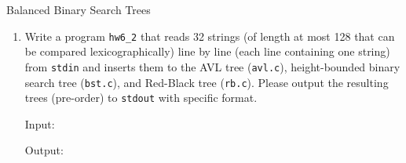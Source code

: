 \begin{homeworkProblem}{Balanced Binary Search Trees}
    \begin{enumerate}[label=(\arabic*)]
        \item
            Write a program \texttt{hw6\_2} that reads 32 strings (of length at
            most 128 that can be compared lexicographically) line by line (each 
            line containing one string) from \texttt{stdin} and inserts them to
            the AVL tree (\texttt{avl.c}), height-bounded binary search tree 
            (\texttt{bst.c}), and Red-Black tree (\texttt{rb.c}). Please output
            the resulting trees (pre-order) to \texttt{stdout} with specific
            format. 

            Input:
            

            Output:
            

    \end{enumerate}
\end{homeworkProblem}

\pagebreak

